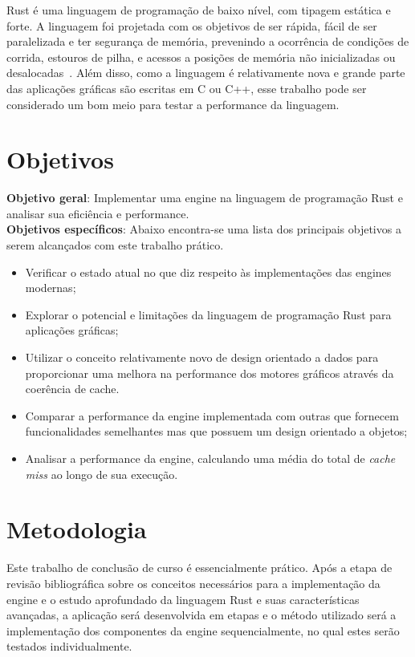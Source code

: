 \documentclass[11pt]{article}
\begin{document}
Rust é uma linguagem de programação de baixo nível, com tipagem estática e forte. A linguagem foi projetada com os objetivos 
de ser rápida, fácil de ser paralelizada e ter segurança de memória, prevenindo a ocorrência de condições de corrida, estouros 
de pilha, e acessos a posições de memória não inicializadas ou desalocadas~\cite{Matsakis:2014:RL:2692956.2663188}. Além disso, 
como a linguagem é relativamente nova e grande parte das aplicações gráficas são escritas em C ou C++, esse trabalho pode ser 
considerado um bom meio para testar a performance da linguagem.

\section{Objetivos}
\label{obj}

\textbf{Objetivo geral}: Implementar uma engine na linguagem de programação Rust e analisar sua eficiência e performance.\\

\noindent\textbf{Objetivos específicos}: 
Abaixo encontra-se uma lista dos principais objetivos a serem alcançados com este trabalho prático.
\begin{itemize}
    \item Verificar o estado atual no que diz respeito às implementações das engines modernas;
    \item Explorar o potencial e limitações da linguagem de programação Rust para aplicações gráficas;
    \item Utilizar o conceito relativamente novo de design orientado a dados para proporcionar uma melhora
        na performance dos motores gráficos através da coerência de cache.
    \item Comparar a performance da engine implementada com outras que fornecem funcionalidades semelhantes mas
        que possuem um design orientado a objetos;
    \item Analisar a performance da engine, calculando uma média do total de \textit{cache miss} ao longo de sua 
        execução.
\end{itemize}

\section{Metodologia}
\label{met}

Este trabalho de conclusão de curso é essencialmente prático. Após a etapa de revisão bibliográfica sobre 
os conceitos necessários para a implementação da engine e o estudo aprofundado da linguagem Rust e suas 
características avançadas, a aplicação será desenvolvida em etapas e o método utilizado será a implementação
dos componentes da engine sequencialmente, no qual estes serão testados individualmente.
\end{document}
